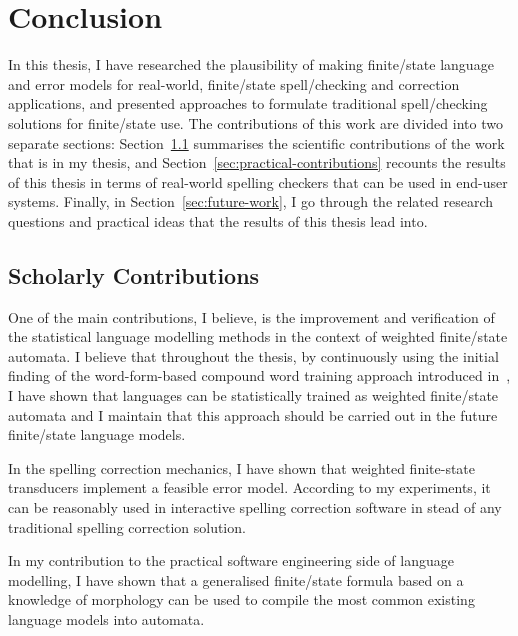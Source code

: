 \documentclass[officiallayout,final]{unihelcompling}
\begin{document}
\chapter{Conclusion}
\label{chap:conclusion}

In this thesis, I have researched the plausibility of making finite\-/state
language and error models for real-world, finite\-/state spell\-/checking and
correction applications, and presented approaches to formulate traditional
spell\-/checking solutions for finite\-/state use. The contributions of this
work are divided into two separate sections:
Section~\ref{sec:scholarly-contributions} summarises the scientific
contributions of the work that is in my thesis, and
Section~\ref{sec:practical-contributions} recounts the results of this thesis
in terms of real-world spelling checkers that can be used in end-user systems.
Finally, in Section~\ref{sec:future-work}, I go through the related research
questions and practical ideas that the results of this thesis lead into.

\section{Scholarly Contributions}
\label{sec:scholarly-contributions}

One of the main contributions, I believe, is the improvement and verification
of the statistical language modelling methods in the context of weighted
finite\-/state automata. I believe that throughout the thesis, by continuously
using the initial finding of the word-form-based compound word training
approach introduced in~, I have shown that
 languages can be
statistically trained as weighted finite\-/state automata and I maintain that
this approach should be carried out in the future finite\-/state language
models.

In the spelling correction mechanics, I have shown that weighted finite-state
transducers implement a feasible error model. According to my experiments, it
can be reasonably used in interactive spelling correction software in stead of
any traditional spelling correction solution.


In my contribution to the practical software engineering side of language
modelling, I have shown that a generalised finite\-/state formula based on a
knowledge of morphology can be used to compile the most common existing
language models into automata.
\end{document}
